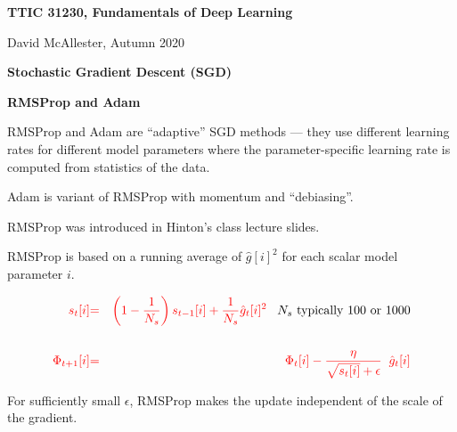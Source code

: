 


\newcommand{\solution}[1]{\bigskip {\bf Solution}: #1}



{\Huge
  \centerline{\bf TTIC 31230, Fundamentals of Deep Learning}
  \bigskip
  \centerline{David McAllester, Autumn 2020}
  \vfill
  \centerline{\bf Stochastic Gradient Descent (SGD)}
  \vfill
  \centerline{\bf RMSProp and Adam}


RMSProp and Adam are ``adaptive'' SGD methods --- they use different learning rates for different model parameters where the parameter-specific learning rate is
computed from statistics of the data.

\vfill
Adam is variant of RMSProp with momentum and ``debiasing''.


RMSProp was introduced in Hinton's class lecture slides.

\vfill
RMSProp is based on a running average of $\hat{g}[i]^2$ for each scalar model parameter $i$.

\begin{eqnarray*}
{\color{red} s_t[i]} & {\color{red} =} & {\color{red} \left(1-\frac{1}{N_s}\right) s_{t-1}[i] + \frac{1}{N_s} \hat{g}_t[i]^2}\;\;\;\mbox{$N_s$ typically 100 or 1000} \\
\\
{\color{red} \Phi_{t+1}[i]} & {\color{red} =} & {\color{red} \Phi_t[i] - \frac{\eta}{\sqrt{s_t[i]} + \epsilon}\;\; \hat{g}_t[i]}
\end{eqnarray*}



For sufficiently small $\epsilon$, RMSProp makes the update independent of the scale of the gradient.

}
